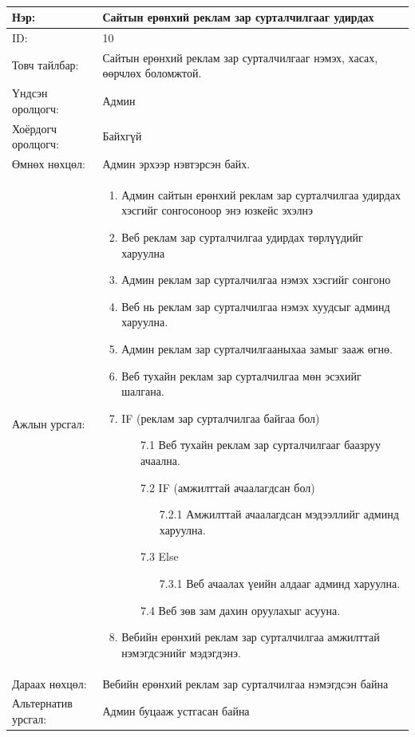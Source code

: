\begin{center}
	\begin{table}[!htbp]
		\caption{}
		\begin{tabular}{|p{4cm}|p{11cm}|}
			\hline
			Нэр: & Сайтын ерөнхий реклам зар сурталчилгааг удирдах  \\
			\hline
			ID: & 10 \\
			\hline
			Товч тайлбар: & Сайтын ерөнхий реклам зар сурталчилгааг нэмэх, хасах, өөрчлөх боломжтой.  \\
			\hline
			Үндсэн оролцогч: & Админ \\
			\hline
			Хоёрдогч оролцогч: & Байхгүй  \\
			\hline
			Өмнөх нөхцөл: &  Админ эрхээр нэвтэрсэн байх. \\
			\hline
			Ажлын урсгал: & \begin{enumerate}
								\item Админ сайтын ерөнхий реклам зар сурталчилгаа удирдах хэсгийг сонгосоноор энэ юзкейс эхэлнэ
								\item Веб реклам зар сурталчилгаа удирдах төрлүүдийг харуулна
								\item Админ реклам зар сурталчилгаа нэмэх хэсгийг сонгоно
								\item Веб нь реклам зар сурталчилгаа нэмэх хуудсыг админд харуулна.
								\item Админ реклам зар сурталчилгааныхаа замыг зааж өгнө.
								\item Веб тухайн реклам зар сурталчилгаа мөн эсэхийг шалгана.
								\item IF (реклам зар сурталчилгаа байгаа бол)
									\begin{enumerate}
										\item[7.1] Веб тухайн реклам зар сурталчилгааг баазруу ачаална.
										\item[7.2] IF (амжилттай ачаалагдсан бол)
											\begin{enumerate}
												\item[7.2.1] Амжилттай ачаалагдсан мэдээллийг админд харуулна. 
											\end{enumerate}
										\item[7.3] Else
											\begin{enumerate}
												\item[7.3.1] Веб ачаалах үеийн алдааг админд харуулна. 
											\end{enumerate}
										\item[7.4] Веб зөв зам дахин оруулахыг асууна.
									\end{enumerate}
								\item Вебийн ерөнхий реклам зар сурталчилгаа амжилттай нэмэгдсэнийг мэдэгдэнэ.
						\end{enumerate}	\\
					\hline
			Дараах нөхцөл: & Вебийн ерөнхий реклам зар сурталчилгаа нэмэгдсэн байна \\
			\hline
			Альтернатив урсгал: & Админ буцааж устгасан байна \\
			\hline
		\end{tabular}
	\end{table}
\end{center}

